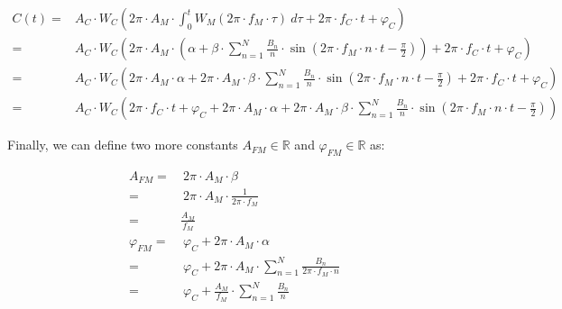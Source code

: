 \documentclass{article}
\begin{document}
    \begin{equation}\label{eqcexp8}
      \begin{split}
        C(t)
          = & A_C \cdot W_C \left(
                2\pi \cdot A_M
                \cdot \int_{0}^{t}
                  W_M \left( 2\pi \cdot f_M \cdot \tau \right) \ d\tau
                + 2\pi \cdot f_C \cdot t
                + \varphi_C
              \right) \\
          = & A_C \cdot W_C \left(
                2\pi \cdot A_M \cdot \left(
                  \alpha
                  + \beta \cdot \sum_{n=1}^{N}
                      \frac{B_n}{n}
                      \cdot \sin \left(
                        2\pi \cdot f_M \cdot n \cdot t - \frac{\pi}{2}
                      \right)
                \right)
                + 2\pi \cdot f_C \cdot t
                + \varphi_C
              \right) \\
          = & A_C \cdot W_C \left(
                2\pi \cdot A_M \cdot \alpha
                + 2\pi \cdot A_M \cdot \beta \cdot \sum_{n=1}^{N}
                    \frac{B_n}{n}
                    \cdot \sin \left(
                      2\pi \cdot f_M \cdot n \cdot t - \frac{\pi}{2}
                    \right)
                + 2\pi \cdot f_C \cdot t
                + \varphi_C
              \right) \\
          = & A_C \cdot W_C \left(
                2\pi \cdot f_C \cdot t
                + \varphi_C
                + 2\pi \cdot A_M \cdot \alpha
                + 2\pi \cdot A_M \cdot \beta \cdot \sum_{n=1}^{N}
                    \frac{B_n}{n}
                    \cdot \sin \left(
                      2\pi \cdot f_M \cdot n \cdot t - \frac{\pi}{2}
                    \right)
              \right)
      \end{split}
    \end{equation}

    Finally, we can define two more constants $A_{FM} \in \mathbb{R}$ and
    $\varphi_{FM} \in \mathbb{R}$ as:

    \begin{equation}
      \begin{split}
        A_{FM}
          = & \ 2\pi \cdot A_M \cdot \beta \\
          = & \ 2\pi \cdot A_M \cdot \frac{1}{2\pi \cdot f_M} \\
          = & \frac{A_M}{f_M} \\
        \varphi_{FM}
          = & \ \varphi_C + 2\pi \cdot A_M \cdot \alpha \\
          = & \ \varphi_C
                  + 2\pi \cdot A_M \cdot \sum_{n=1}^{N}
                    \frac{B_n}{2\pi \cdot f_M \cdot n} \\
          = & \ \varphi_C + \frac{A_M}{f_M} \cdot \sum_{n=1}^{N} \frac{B_n}{n}
      \end{split}
    \end{equation}
\end{document}
